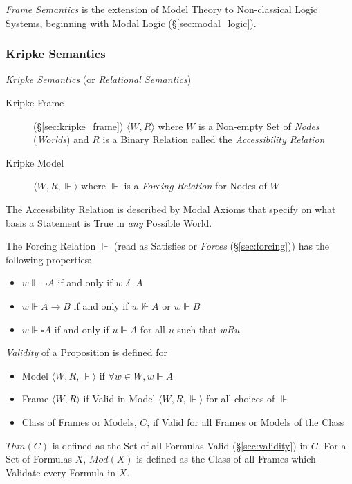 \emph{Frame Semantics} is the extension of Model Theory to
Non-classical Logic Systems, beginning with Modal Logic
(\S\ref{sec:modal_logic}).



\subsubsection{Kripke Semantics}\label{sec:kripke_semantics}

\emph{Kripke Semantics} (or \emph{Relational Semantics})

\begin{description}
\item [Kripke Frame] (\S\ref{sec:kripke_frame}) $\langle W,R \rangle$
  where $W$ is a Non-empty Set of \emph{Nodes} (\emph{Worlds}) and $R$
  is a Binary Relation called the \emph{Accessibility Relation}
\item [Kripke Model] $\langle W,R,\Vdash \rangle$ where $\Vdash$ is a
  \emph{Forcing Relation} for Nodes of $W$
\end{description}
The Accessbility Relation is described by Modal Axioms that specify on
what basis a Statement is True in \emph{any} Possible World.

The Forcing Relation $\Vdash$ (read as Satisfies or \emph{Forces}
(\S\ref{sec:forcing})) has the following properties:
\begin{itemize}
\item $w \Vdash \neg A$ if and only if $w \nVdash A$
\item $w \Vdash A \rightarrow B$ if and only if $w \nVdash A$ or $w
  \Vdash B$
\item $w \Vdash \square A$ if and only if $u \Vdash A$ for all $u$
  such that $w R u$
\end{itemize}
\emph{Validity} of a Proposition is defined for
\begin{itemize}
\item Model $\langle W,R, \Vdash \rangle$ if $\forall w \in W,
  w \Vdash A$
\item Frame $\langle W,R \rangle$ if Valid in Model $\langle W,R,
  \Vdash \rangle$ for all choices of $\Vdash$
\item Class of Frames or Models, $C$, if Valid for all Frames or
  Models of the Class
\end{itemize}
$Thm(C)$ is defined as the Set of all Formulas Valid
(\S\ref{sec:validity}) in $C$. For a Set of Formulas $X$,
$Mod(X)$ is defined as the Class of all Frames which Validate every
Formula in $X$.

